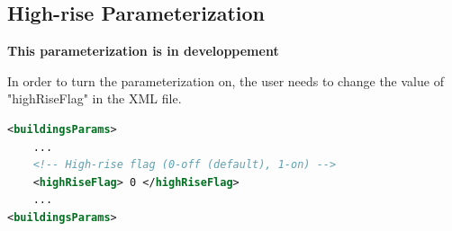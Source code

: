 \subsection{High-rise Parameterization}

\textbf{This parameterization is in developpement}

In order to turn the parameterization on, the user needs to change the value of "highRiseFlag" in the XML file.

\begin{lstlisting}[language=XML]
<buildingsParams>
	...
	<!-- High-rise flag (0-off (default), 1-on) -->
    <highRiseFlag> 0 </highRiseFlag> 
	... 				
<buildingsParams>
\end{lstlisting}
